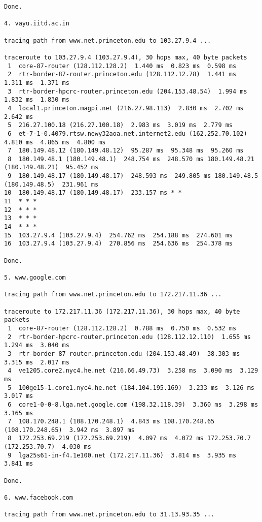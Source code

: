 \documentclass[a4paper]{article}
\begin{document}
\begin{enumerate}
\begin{lstlisting}
Done.

4. vayu.iitd.ac.in

tracing path from www.net.princeton.edu to 103.27.9.4 ...

traceroute to 103.27.9.4 (103.27.9.4), 30 hops max, 40 byte packets
 1  core-87-router (128.112.128.2)  1.440 ms  0.823 ms  0.598 ms
 2  rtr-border-87-router.princeton.edu (128.112.12.78)  1.441 ms  1.311 ms  1.371 ms
 3  rtr-border-hpcrc-router.princeton.edu (204.153.48.54)  1.994 ms  1.832 ms  1.830 ms
 4  local1.princeton.magpi.net (216.27.98.113)  2.830 ms  2.702 ms  2.642 ms
 5  216.27.100.18 (216.27.100.18)  2.983 ms  3.019 ms  2.779 ms
 6  et-7-1-0.4079.rtsw.newy32aoa.net.internet2.edu (162.252.70.102)  4.810 ms  4.865 ms  4.800 ms
 7  180.149.48.12 (180.149.48.12)  95.287 ms  95.348 ms  95.260 ms
 8  180.149.48.1 (180.149.48.1)  248.754 ms  248.570 ms 180.149.48.21 (180.149.48.21)  95.452 ms
 9  180.149.48.17 (180.149.48.17)  248.593 ms  249.805 ms 180.149.48.5 (180.149.48.5)  231.961 ms
10  180.149.48.17 (180.149.48.17)  233.157 ms * *
11  * * *
12  * * *
13  * * *
14  * * *
15  103.27.9.4 (103.27.9.4)  254.762 ms  254.188 ms  274.601 ms
16  103.27.9.4 (103.27.9.4)  270.856 ms  254.636 ms  254.378 ms

Done.

5. www.google.com

tracing path from www.net.princeton.edu to 172.217.11.36 ...

traceroute to 172.217.11.36 (172.217.11.36), 30 hops max, 40 byte packets
 1  core-87-router (128.112.128.2)  0.788 ms  0.750 ms  0.532 ms
 2  rtr-border-hpcrc-router.princeton.edu (128.112.12.110)  1.655 ms  1.294 ms  3.040 ms
 3  rtr-border-87-router.princeton.edu (204.153.48.49)  38.303 ms  3.315 ms  2.017 ms
 4  ve1205.core2.nyc4.he.net (216.66.49.73)  3.258 ms  3.090 ms  3.129 ms
 5  100ge15-1.core1.nyc4.he.net (184.104.195.169)  3.233 ms  3.126 ms  3.017 ms
 6  core1-0-0-8.lga.net.google.com (198.32.118.39)  3.360 ms  3.298 ms  3.165 ms
 7  108.170.248.1 (108.170.248.1)  4.843 ms 108.170.248.65 (108.170.248.65)  3.942 ms  3.897 ms
 8  172.253.69.219 (172.253.69.219)  4.097 ms  4.072 ms 172.253.70.7 (172.253.70.7)  4.030 ms
 9  lga25s61-in-f4.1e100.net (172.217.11.36)  3.814 ms  3.935 ms  3.841 ms

Done. 

6. www.facebook.com

tracing path from www.net.princeton.edu to 31.13.93.35 ...


\end{lstlisting}
\end{enumerate}
\end{document}
